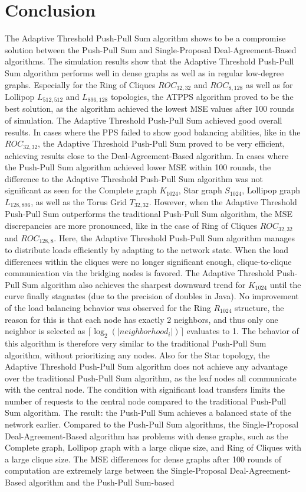 \chapter{Conclusion}\label{chap:conclusion}
The Adaptive Threshold Push-Pull Sum algorithm shows to be a compromise solution between the Push-Pull Sum and Single-Proposal Deal-Agreement-Based algorithms. The simulation results show that the Adaptive Threshold Push-Pull Sum algorithm performs well in dense graphs as well as in regular low-degree graphs. Especially for the Ring of Cliques $ROC_{32,32}$ and $ROC_{8,128}$ as well as for Lollipop $L_{512,512}$ and $L_{896,128}$ topologies, the ATPPS algorithm proved to be the best solution, as the algorithm achieved the lowest MSE values after 100 rounds of simulation. The Adaptive Threshold Push-Pull Sum achieved good overall results. In cases where the PPS failed to show good balancing abilities, like in the $ROC_{32,32}$, the Adaptive Threshold Push-Pull Sum proved to be very efficient, achieving results close to the Deal-Agreement-Based algorithm. In cases where the Push-Pull Sum algorithm achieved lower MSE within 100 rounds, the difference to the Adaptive Threshold Push-Pull Sum algorithm was not significant as seen for the Complete graph $K_{1024}$, Star graph $S_{1024}$, Lollipop graph $L_{128,896}$, as well as the Torus Grid $T_{32,32}$. However, when the Adaptive Threshold Push-Pull Sum outperforms the traditional Push-Pull Sum algorithm, the MSE discrepancies are more pronounced, like in the case of Ring of Cliques $ROC_{32,32}$ and $ROC_{128,8}$. Here, the Adaptive Threshold Push-Pull Sum algorithm manages to distribute loads efficiently by adapting to the network state. When the load differences within the cliques were no longer significant enough, clique-to-clique communication via the bridging nodes is favored. The Adaptive Threshold Push-Pull Sum algorithm also achieves the sharpest downward trend for $K_{1024}$ until the curve finally stagnates (due to the precision of doubles in Java). No improvement of the load balancing behavior was observed for the Ring $R_{1024}$ structure, the reason for this is that each node has exactly 2 neighbors, and thus only one neighbor is selected as $\lceil\log_{2}{(|neighborhood_{i}|)}\rceil$ evaluates to 1. The behavior of this algorithm is therefore very similar to the traditional Push-Pull Sum algorithm, without prioritizing any nodes. Also for the Star topology, the Adaptive Threshold Push-Pull Sum algorithm does not achieve any advantage over the traditional Push-Pull Sum algorithm, as the leaf nodes all communicate with the central node. The condition with significant load transfers limits the number of requests to the central node compared to the traditional Push-Pull Sum algorithm. The result: the Push-Pull Sum achieves a balanced state of the network earlier. Compared to the Push-Pull Sum algorithms, the Single-Proposal Deal-Agreement-Based algorithm has problems with dense graphs, such as the Complete graph, Lollipop graph with a large clique size, and Ring of Cliques with a large clique size. The MSE differences for dense graphs after 100 rounds of computation are extremely large between the Single-Proposal Deal-Agreement-Based algorithm and the Push-Pull Sum-based 